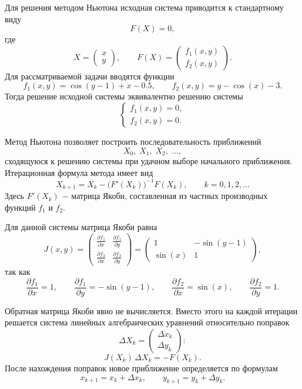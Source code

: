 Для решения методом Ньютона исходная система приводится к стандартному виду
\[
    F(X)=0,
\]
где
\[
    X=
    \begin{pmatrix}
        x \\
        y
    \end{pmatrix},
    \qquad
    F(X)=
    \begin{pmatrix}
        f_1(x,y) \\
        f_2(x,y)
    \end{pmatrix}.
\]
Для рассматриваемой задачи вводятся функции
\[
    f_1(x,y)=\cos(y-1)+x-0.5,
    \qquad
    f_2(x,y)=y-\cos(x)-3.
\]
Тогда решение исходной системы эквивалентно решению системы
\[
    \begin{cases}
        f_1(x,y)=0, \\
        f_2(x,y)=0.
    \end{cases}
\]

Метод Ньютона позволяет построить последовательность приближений
\[
    X_0,\;X_1,\;X_2,\;\dots,
\]
сходящуюся к решению системы при удачном выборе начального приближения. Итерационная формула метода имеет вид
\[
    X_{k+1}=X_k-\bigl(F'(X_k)\bigr)^{-1}F(X_k),
    \qquad k=0,1,2,\dots
\]
Здесь \(F'(X_k)\) $-$ матрица Якоби, составленная из частных производных функций \(f_1\) и \(f_2\).

Для данной системы матрица Якоби равна
\[
    J(x,y)=
    \begin{pmatrix}
        \frac{\partial f_1}{\partial x} & \frac{\partial f_1}{\partial y} \\
        \frac{\partial f_2}{\partial x} & \frac{\partial f_2}{\partial y}
    \end{pmatrix}
    =
    \begin{pmatrix}
        1       & -\sin(y-1) \\
        \sin(x) & 1
    \end{pmatrix},
\]
так как
\[
    \frac{\partial f_1}{\partial x}=1,
    \qquad
    \frac{\partial f_1}{\partial y}=-\sin(y-1),
    \qquad
    \frac{\partial f_2}{\partial x}=\sin(x),
    \qquad
    \frac{\partial f_2}{\partial y}=1.
\]

Обратная матрица Якоби явно не вычисляется. Вместо этого на каждой итерации решается система линейных алгебраических уравнений относительно поправок
\[
    \Delta X_k=
    \begin{pmatrix}
        \Delta x_k \\
        \Delta y_k
    \end{pmatrix}:
\]
\[
    J(X_k)\,\Delta X_k=-F(X_k).
\]
После нахождения поправок новое приближение определяется по формулам
\[
    x_{k+1}=x_k+\Delta x_k,
    \qquad
    y_{k+1}=y_k+\Delta y_k.
\]


